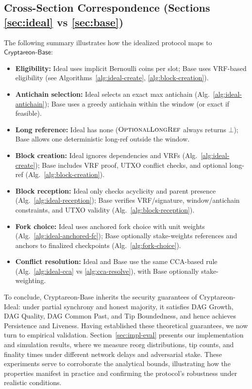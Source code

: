 \documentclass[11pt]{article}
\newcommand{\ProjBase}{\ensuremath{\mathsf{Cryptareon\text{-}Base}}\xspace}
\newcommand{\OptionalLongRef}{\textsc{OptionalLongRef}\xspace}
\begin{document}
\subsection{Cross-Section Correspondence (Sections \ref{sec:ideal} vs \ref{sec:base})}
The following summary illustrates how the idealized protocol maps to \ProjBase:
\begin{itemize}
  \item \textbf{Eligibility:} Ideal uses implicit Bernoulli coins per slot; Base uses VRF-based eligibility (see Algorithms~\ref{alg:ideal-create}, \ref{alg:block-creation}).
  \item \textbf{Antichain selection:} Ideal selects an exact max antichain (Alg.~\ref{alg:ideal-antichain}); Base uses a greedy antichain within the window (or exact if feasible).
  \item \textbf{Long reference:} Ideal has none ($\OptionalLongRef$ always returns $\bot$); Base allows one deterministic long-ref outside the window.
  \item \textbf{Block creation:} Ideal ignores dependencies and VRFs (Alg.~\ref{alg:ideal-create}); Base includes VRF proof, UTXO conflict checks, and optional long-ref (Alg.~\ref{alg:block-creation}).
  \item \textbf{Block reception:} Ideal only checks acyclicity and parent presence (Alg.~\ref{alg:ideal-reception}); Base verifies VRF/signature, window/antichain constraints, and UTXO validity (Alg.~\ref{alg:block-reception}).
  \item \textbf{Fork choice:} Ideal uses anchored fork choice with unit weights (Alg.~\ref{alg:ideal-anchored-fc}); Base optionally stake-weights references and anchors to finalized checkpoints (Alg.~\ref{alg:fork-choice}).
  \item \textbf{Conflict resolution:} Ideal and Base use the same CCA-based rule (Alg.~\ref{alg:ideal-cca} vs \ref{alg:cca-resolve}), with Base optionally stake-weighting.
\end{itemize}


To conclude, Cryptareon-Base inherits the security guarantees of Cryptareon-Ideal: under partial
synchrony and honest majority, it satisfies DAG Growth, DAG Quality, DAG Common Past, and Tip
Boundedness, and hence achieves Persistence and Liveness. Having established these theoretical
guarantees, we now turn to empirical validation. Section~\ref{sec:impl-eval}
 presents our implementation and
simulation results, where we measure reorg distributions, tip counts, and finality times under
different network delays and adversarial stake. These experiments serve to corroborate the
analytical bounds, illustrating how the properties manifest in practice and confirming the protocol’s
robustness under realistic conditions.









\end{document}
